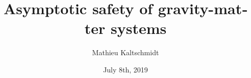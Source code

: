 \title{Asymptotic safety of gravity-matter systems}
\author[Mathieu Kaltschmidt]{Mathieu Kaltschmidt}


\date[08. Juli 2019]
{
July 8th, 2019
}



\usepackage{amsmath, amssymb, commath, mathtools}
\usepackage{physics}
\usepackage{xfrac}
\usepackage[separate-uncertainty]{siunitx}


\usepackage{array} %
\usepackage{booktabs} %

\usepackage{fontspec, xunicode}
\usepackage[utf8]{inputenc}
\usepackage{lmodern}
\setsansfont{Palatino}
\setmonofont[Scale=MatchLowercase]{Menlo}
\usepackage{polyglossia}
\setmainlanguage{english}
\usepackage{microtype}

\usepackage{graphicx} %
\usepackage{float} %
\usepackage{blindtext} %
\usepackage[labelfont=bf]{caption} %
\usepackage{subcaption} %

\usepackage[
	style=numeric-comp,
	backend=biber,
	isbn=false,
	date=year,
	url=false,
	doi=false,
	hyperref = auto
]{biblatex}


\beamertemplatenavigationsymbolsempty

